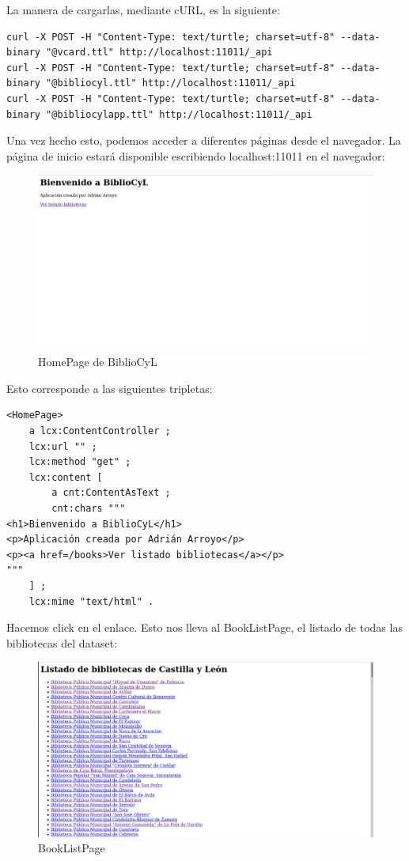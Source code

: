 \documentclass[12pt]{report} %
\begin{document}
La manera de cargarlas, mediante cURL, es la siguiente:
\begin{verbatim}
curl -X POST -H "Content-Type: text/turtle; charset=utf-8" --data-binary "@vcard.ttl" http://localhost:11011/_api
curl -X POST -H "Content-Type: text/turtle; charset=utf-8" --data-binary "@bibliocyl.ttl" http://localhost:11011/_api
curl -X POST -H "Content-Type: text/turtle; charset=utf-8" --data-binary "@bibliocylapp.ttl" http://localhost:11011/_api
\end{verbatim}

Una vez hecho esto, podemos acceder a diferentes páginas desde el navegador. La página de inicio estará disponible escribiendo localhost:11011 en el navegador:
\begin{figure}
    \centering
    \includegraphics[width=\textwidth]{tour/bibliocyl1.png}
    \caption{HomePage de BiblioCyL}
    \label{fig:bibliocyl1}
\end{figure}

Esto corresponde a las siguientes tripletas:
\begin{lstlisting}
<HomePage>
    a lcx:ContentController ;
    lcx:url "" ;
    lcx:method "get" ;
    lcx:content [
        a cnt:ContentAsText ;
        cnt:chars """
<h1>Bienvenido a BiblioCyL</h1>
<p>Aplicación creada por Adrián Arroyo</p>
<p><a href=/books>Ver listado bibliotecas</a></p>
"""
    ] ;
    lcx:mime "text/html" .
\end{lstlisting}

Hacemos click en el enlace. Esto nos lleva al BookListPage, el listado de todas las bibliotecas del dataset:

\begin{figure}
    \centering
    \includegraphics[width=\textwidth]{tour/bibliocyl2.png}
    \caption{BookListPage}
    \label{fig:bibliocyl2}
\end{figure}
\end{document}
